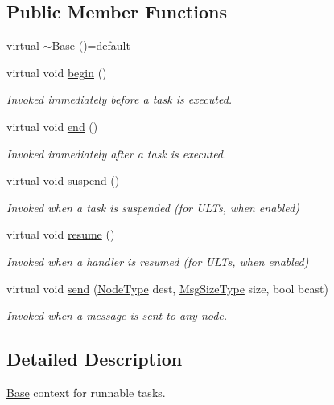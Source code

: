 \subsection*{Public Member Functions}
\begin{DoxyCompactItemize}
\item 
virtual \hyperlink{structvt_1_1ctx_1_1_base_a11811118c1c91d93e7679610bf8377f2}{$\sim$\+Base} ()=default
\item 
virtual void \hyperlink{structvt_1_1ctx_1_1_base_aab5524952e1bb163ccba5df64a303168}{begin} ()
\begin{DoxyCompactList}\small\item\em Invoked immediately before a task is executed. \end{DoxyCompactList}\item 
virtual void \hyperlink{structvt_1_1ctx_1_1_base_a113bac732b2831caa8eed11609ccaf0e}{end} ()
\begin{DoxyCompactList}\small\item\em Invoked immediately after a task is executed. \end{DoxyCompactList}\item 
virtual void \hyperlink{structvt_1_1ctx_1_1_base_a445badaaad72b44313084b2c95a13003}{suspend} ()
\begin{DoxyCompactList}\small\item\em Invoked when a task is suspended (for U\+L\+Ts, when enabled) \end{DoxyCompactList}\item 
virtual void \hyperlink{structvt_1_1ctx_1_1_base_a303afabb40ed83057fbe30c744db95da}{resume} ()
\begin{DoxyCompactList}\small\item\em Invoked when a handler is resumed (for U\+L\+Ts, when enabled) \end{DoxyCompactList}\item 
virtual void \hyperlink{structvt_1_1ctx_1_1_base_ad704f380544dc7e874e23f5700c52db0}{send} (\hyperlink{namespacevt_a866da9d0efc19c0a1ce79e9e492f47e2}{Node\+Type} dest, \hyperlink{namespacevt_a408e86a8c7c89309b52907dc5a513924}{Msg\+Size\+Type} size, bool bcast)
\begin{DoxyCompactList}\small\item\em Invoked when a message is sent to any node. \end{DoxyCompactList}\end{DoxyCompactItemize}


\subsection{Detailed Description}
\hyperlink{structvt_1_1ctx_1_1_base}{Base} context for runnable tasks. 

